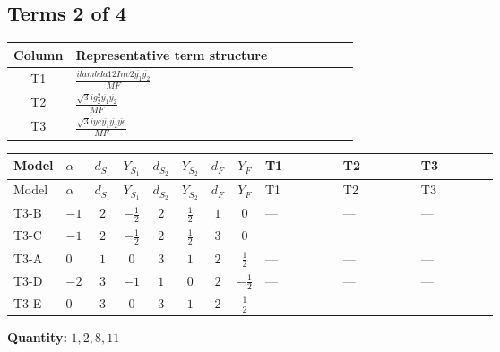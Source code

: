 \documentclass[8pt]{article}
\begin{document}
\begin{landscape}
\subsection*{Terms 2 of 4}
\begin{center}
\begin{tabular}{@{}c >{\raggedright\arraybackslash}p{0.82\linewidth}@{}}
\toprule
Column & Representative term structure \\
\midrule
T1 & \(\displaystyle \frac{i lambda12Inv2 \overline{y_{1}} \overline{y_{2}}}{MF}\) \\
\midrule
T2 & \(\displaystyle \frac{\sqrt{3} i g_{2}^{2} \overline{y_{1}} \overline{y_{2}}}{MF}\) \\
\midrule
T3 & \(\displaystyle \frac{\sqrt{3} i ye \overline{y_{1}} \overline{y_{2}} \overline{ye}}{MF}\) \\
\midrule
\bottomrule
\end{tabular}
\end{center}
\smallskip
\tiny
\begin{longtable}{@{}llcccccc >{\raggedright\arraybackslash}p{0.21\linewidth} >{\raggedright\arraybackslash}p{0.21\linewidth} >{\raggedright\arraybackslash}p{0.21\linewidth}@{}}
\toprule
Model & $\alpha$ & $d_{S_1}$ & $Y_{S_1}$ & $d_{S_2}$ & $Y_{S_2}$ & $d_F$ & $Y_F$ & T1 & T2 & T3 \\
\midrule
\endfirsthead
\toprule
Model & $\alpha$ & $d_{S_1}$ & $Y_{S_1}$ & $d_{S_2}$ & $Y_{S_2}$ & $d_F$ & $Y_F$ & T1 & T2 & T3 \\
\midrule
\endhead
T3-B & $-1$ & $2$ & $-\frac{1}{2}$ & $2$ & $\frac{1}{2}$ & $1$ & $0$ & --- & --- & --- \\
\midrule
T3-C & $-1$ & $2$ & $-\frac{1}{2}$ & $2$ & $\frac{1}{2}$ & $3$ & $0$ & \scriptsize\adjustbox{max width=\linewidth}{$\begin{gathered} - \frac{i lambda12Inv2 \overline{y_{1}} \overline{y_{2}}}{6 MF}\end{gathered}$} & \scriptsize\adjustbox{max width=\linewidth}{$\begin{gathered} - \frac{\sqrt{3} i g_{2}^{2} \overline{y_{1}} \overline{y_{2}}}{8 MF}\end{gathered}$} & \scriptsize\adjustbox{max width=\linewidth}{$\begin{gathered} \frac{\sqrt{3} i ye \overline{y_{1}} \overline{y_{2}} \overline{ye}}{24 MF}\end{gathered}$} \\
\midrule
T3-A & $0$ & $1$ & $0$ & $3$ & $1$ & $2$ & $\frac{1}{2}$ & --- & --- & --- \\
\midrule
T3-D & $-2$ & $3$ & $-1$ & $1$ & $0$ & $2$ & $-\frac{1}{2}$ & --- & --- & --- \\
\midrule
T3-E & $0$ & $3$ & $0$ & $3$ & $1$ & $2$ & $\frac{1}{2}$ & --- & --- & --- \\
\midrule
\bottomrule
\end{longtable}
\clearpage
\noindent\textbf{Quantity: }$\mathrm{1,2,8,11}$\par\smallskip

\end{landscape}
\end{document}
